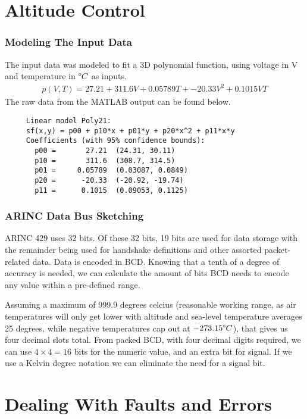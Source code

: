 \documentclass[english,palatino]{ist-report}
\begin{document}
\part{Altitude Control}

\section{Modeling The Input Data}

The input data was modeled to fit a 3D polynomial function, using voltage in \si{\volt} and temperature in $\degree C$ as inputs.
\begin{gather*}
	p(V,T) = 27.21 + 311.6V + 0.05789T + -20.33V^2 + 0.1015VT
\end{gather*}
The raw data from the MATLAB output can be found below.  
\begin{verbatim}
     Linear model Poly21:
     sf(x,y) = p00 + p10*x + p01*y + p20*x^2 + p11*x*y
     Coefficients (with 95% confidence bounds):
       p00 =       27.21  (24.31, 30.11)
       p10 =       311.6  (308.7, 314.5)
       p01 =     0.05789  (0.03087, 0.0849)
       p20 =      -20.33  (-20.92, -19.74)
       p11 =      0.1015  (0.09053, 0.1125)
\end{verbatim}

\section{ARINC Data Bus Sketching}

ARINC 429 uses 32 bits. Of these 32 bits, 19 bits are used for data storage with the remainder being used for handshake definitions and other assorted packet-related data. Data is encoded in BCD. Knowing that a tenth of a degree of accuracy is needed, we can calculate the amount of bits BCD needs to encode any value within a pre-defined range.

Assuming a maximum of $999.9$ degrees celcius (reasonable working range, as air temperatures will only get lower with altitude and sea-level temperature averages 25 degrees, while negative temperatures cap out at $\num{-273.15}\degree C$), that gives us four decimal slots total. From packed BCD, with four decimal digits required, we can use $4 \times 4 = 16$ bits for the numeric value, and an extra bit for signal. If we use a Kelvin degree notation we can eliminate the need for a signal bit.

\part{Dealing With Faults and Errors}
\end{document}
